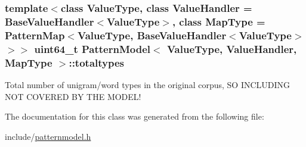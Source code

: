 \hypertarget{classPatternModel_af9de224847465b75a9be436b1990cef7}{}
\subsubsection[{totaltypes}]{\setlength{\rightskip}{0pt plus 5cm}template$<$class Value\+Type, class Value\+Handler = Base\+Value\+Handler$<$\+Value\+Type$>$, class Map\+Type = Pattern\+Map$<$\+Value\+Type, Base\+Value\+Handler$<$\+Value\+Type$>$$>$$>$ uint64\+\_\+t {\bf Pattern\+Model}$<$ Value\+Type, Value\+Handler, Map\+Type $>$\+::totaltypes\hspace{0.3cm}{\ttfamily [protected]}}\label{classPatternModel_af9de224847465b75a9be436b1990cef7}


Total number of unigram/word types in the original corpus, S\+O I\+N\+C\+L\+U\+D\+I\+N\+G N\+O\+T C\+O\+V\+E\+R\+E\+D B\+Y T\+H\+E M\+O\+D\+E\+L! 



The documentation for this class was generated from the following file\+:\begin{DoxyCompactItemize}
\item 
include/\hyperlink{patternmodel_8h}{patternmodel.\+h}\end{DoxyCompactItemize}
